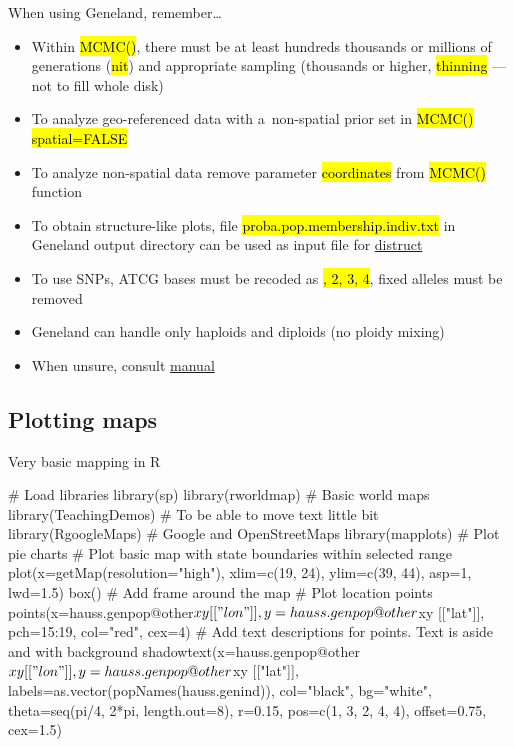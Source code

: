 \documentclass[compress, ucs, xelatex, 11pt, xcolor=svgnames,
  hyperref={
    bookmarks=true,
    unicode=true,
    colorlinks=true,
    pdftitle={Molecular data in R},
    plainpages=false,
    pdfauthor={Vojtech Zeisek},
    pdfsubject={Course about phylogeny and evolution in R},
    pdfcreator={XeLaTeX},
    pdfkeywords={R, evolution, phylogeny, molecular data},
    linkcolor=Tomato,
    anchorcolor=SaddleBrown,
    citecolor=Goldenrod,
    filecolor=DarkMagenta,
    menucolor=Sienna,
    urlcolor=DarkTurquoise,
    pdftex},
  url={hyphens, lowtilde} %
  ]{beamer}
\renewcommand{\texttt}[1]{\hl{\ttfamily #1}}
\begin{document}
\begin{frame}{When using Geneland, remember\ldots}
  \begin{itemize}
    \item Within \texttt{MCMC()}, there must be at least hundreds thousands or millions of generations (\texttt{nit}) and appropriate sampling (thousands or higher, \texttt{thinning} --- not to fill whole disk)
    \item To analyze geo-referenced data with a~non-spatial prior set in \texttt{MCMC()} \texttt{spatial=FALSE}
    \item To analyze non-spatial data remove parameter \texttt{coordinates} from \texttt{MCMC()} function
    \item To obtain structure-like plots, file \texttt{proba.pop.membership.indiv.txt} in Geneland output directory can be used as input file for \href{https://web.stanford.edu/group/rosenberglab/distruct.html}{distruct}
    \item To use SNPs, ATCG bases must be recoded as \texttt{1, 2, 3, 4}, fixed alleles must be removed
    \item Geneland can handle only haploids and diploids (no ploidy mixing)
    \item When unsure, consult \href{https://www2.imm.dtu.dk/~gigu/Geneland/Geneland-Doc.pdf}{manual}
  \end{itemize}
\end{frame}

\subsection{Plotting maps}

\begin{frame}[fragile]{Very basic mapping in R}
  \begin{spluscode}
    # Load libraries
    library(sp)
    library(rworldmap) # Basic world maps
    library(TeachingDemos) # To be able to move text little bit
    library(RgoogleMaps) # Google and OpenStreetMaps
    library(mapplots) # Plot pie charts
    # Plot basic map with state boundaries within selected range
    plot(x=getMap(resolution="high"), xlim=c(19, 24), ylim=c(39, 44),
      asp=1, lwd=1.5)
    box() # Add frame around the map
    # Plot location points
    points(x=hauss.genpop@other$xy[["lon"]], y=hauss.genpop@other$xy
      [["lat"]], pch=15:19, col="red", cex=4)
    # Add text descriptions for points. Text is aside and with background
    shadowtext(x=hauss.genpop@other$xy[["lon"]], y=hauss.genpop@other$xy
      [["lat"]], labels=as.vector(popNames(hauss.genind)), col="black",
      bg="white", theta=seq(pi/4, 2*pi, length.out=8), r=0.15,
      pos=c(1, 3, 2, 4, 4), offset=0.75, cex=1.5)
  \end{spluscode}
\end{frame}
\end{document}

